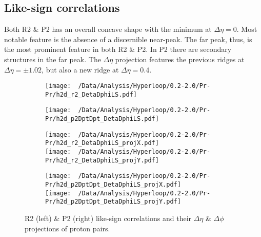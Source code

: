 \documentclass[12pt,a4paper,twoside]{report}
\begin{document}
\subsection{Like-sign correlations}
Both R2 \& P2 has an overall concave shape with the minimum at $\Delta\eta=0$. Most notable feature is the absence of a discernible near-peak. The far peak, thus, is the most prominent feature in both R2 \& P2. In P2 there are secondary structures in the far peak. The $\Delta\eta$ projection features the previous ridges at $\Delta\eta=\pm1.02$, but also a new ridge at $\Delta\eta=0.4$.
\begin{figure}[H]
	\begin{subfigure}{0.49\linewidth}
		\texttt{[image: ~/Data/Analysis/Hyperloop/0.2-2.0/Pr-Pr/h2d\_r2\_DetaDphiLS.pdf]}\\
	\end{subfigure}
	\begin{subfigure}{0.49\linewidth}
		\texttt{[image: ~/Data/Analysis/Hyperloop/0.2-2.0/Pr-Pr/h2d\_p2DptDpt\_DetaDphiLS.pdf]}\\
	\end{subfigure}
\end{figure}
\begin{figure}[H]
	\ContinuedFloat
	\begin{subfigure}{0.49\linewidth}
		\texttt{[image: ~/Data/Analysis/Hyperloop/0.2-2.0/Pr-Pr/h2d\_r2\_DetaDphiLS\_projX.pdf]}\\
		\texttt{[image: ~/Data/Analysis/Hyperloop/0.2-2.0/Pr-Pr/h2d\_r2\_DetaDphiLS\_projY.pdf]}\\
	\end{subfigure}
	\begin{subfigure}{0.49\linewidth}
		\texttt{[image: ~/Data/Analysis/Hyperloop/0.2-2.0/Pr-Pr/h2d\_p2DptDpt\_DetaDphiLS\_projX.pdf]}\\
		\texttt{[image: ~/Data/Analysis/Hyperloop/0.2-2.0/Pr-Pr/h2d\_p2DptDpt\_DetaDphiLS\_projY.pdf]}\\
	\end{subfigure}
	\caption{R2 (left) \& P2 (right) like-sign correlations and their $\Delta\eta$ \& $\Delta\phi$ projections of proton pairs.}
\end{figure}
\end{document}
